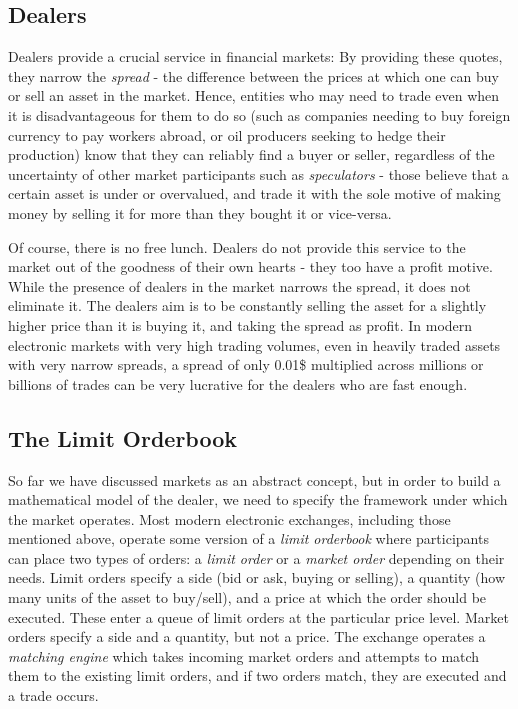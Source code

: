 \subsection*{Dealers}
Dealers provide a crucial service in financial markets: By providing these quotes, 
they narrow the \textit{spread} - the difference between the prices at which one can 
buy or sell an asset in the market. Hence, entities who may need to trade even when 
it is disadvantageous for them to do so (such as companies needing to buy foreign currency to pay 
workers abroad, or oil producers seeking to hedge their production) know that they 
can reliably find a buyer or seller, regardless of the uncertainty of other market 
participants such as \textit{speculators} - those believe that a certain asset is 
under or overvalued, and trade it with the sole motive of making money by selling 
it for more than they bought it or vice-versa.

Of course, there is no free lunch. Dealers do not provide this service to the market 
out of the goodness of their own hearts - they too have a profit motive. While the 
presence of dealers in the market narrows the spread, it does not eliminate it. 
The dealers aim is to be constantly selling the asset for a slightly higher price 
than it is buying it, and taking the spread as profit. In modern electronic markets 
with very high trading volumes, even in heavily traded assets with very narrow 
spreads, a spread of only 0.01\$ multiplied across millions or billions of trades 
can be very lucrative for the dealers who are fast enough.

\subsection*{The Limit Orderbook}
So far we have discussed markets as an abstract concept, but in order to build a 
mathematical model of the dealer, we need to specify the framework under which the 
market operates. Most modern electronic exchanges, including those mentioned above, 
operate some version of a \textit{limit orderbook} where participants can place two 
types of orders: a \textit{limit order} or a \textit{market order} depending on their 
needs. Limit orders specify a side (bid or ask, buying or selling), a quantity (how 
many units of the asset to buy/sell), and a price at which the order should be 
executed. These enter a queue of limit orders at the particular price level. Market 
orders specify a side and a quantity, but not a price. The exchange operates a 
\textit{matching engine} which takes incoming market orders and attempts to match 
them to the existing limit orders, and if two orders match, they are executed and a 
trade occurs. 

